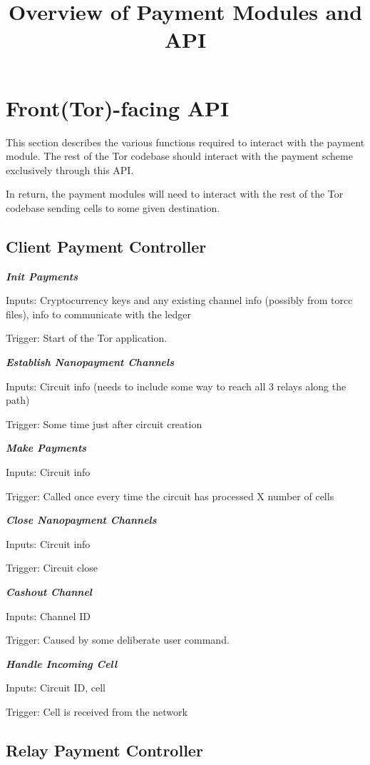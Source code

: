 \documentclass{article}
\title{Overview of Payment Modules and API}
\date{}
\begin{document}
\section{Front(Tor)-facing API}

This section describes the various functions required to interact with the
payment module. The rest of the Tor codebase should interact with the payment
scheme exclusively through this API.

In return, the payment modules will need to interact with the rest of the Tor
codebase sending cells to some given destination.

\subsection{Client Payment Controller}

\textbf{\emph{Init Payments}}

Inputs: Cryptocurrency keys and any existing channel info (possibly from torcc files), info to
communicate with the ledger

Trigger: Start of the Tor application.

\textbf{\emph{Establish Nanopayment Channels}}

Inputs: Circuit info (needs to include some way to reach all 3 relays
along the path)

Trigger: Some time just after circuit creation

\textbf{\emph{Make Payments}}

Inputs: Circuit info

Trigger: Called once every time the circuit has processed X number of cells

\textbf{\emph{Close Nanopayment Channels}}

Inputs: Circuit info

Trigger: Circuit close

\textbf{\emph{Cashout Channel}}

Inputs: Channel ID

Trigger: Caused by some deliberate user command.

\textbf{\emph{Handle Incoming Cell}}

Inputs: Circuit ID, cell

Trigger: Cell is received from the network

\subsection{Relay Payment Controller}
\end{document}
